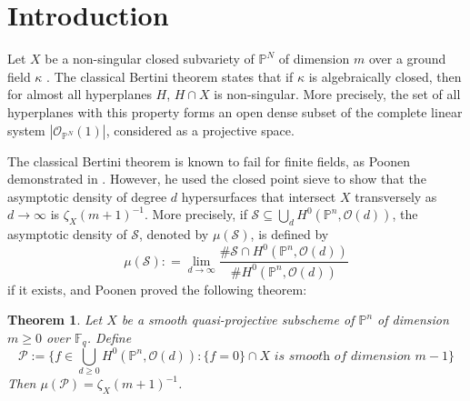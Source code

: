 \documentclass[12pt]{article}
\theoremstyle{plain}
\newtheorem{theorem}[equation]{Theorem}
\theoremstyle{definition}
\newcommand{\IF}{\mathbb{F}}
\newcommand{\IP}{\mathbb{P}}
\newcommand{\sO}{\mathcal{O}}
\newcommand{\sP}{\mathcal{P}}
\newcommand{\sS}{\mathcal{S}}
\newcommand\union{\bigcup}
\newcommand{\<}{\langle}
\renewcommand{\>}{\rangle}
\begin{document}
\newpage

\section{Introduction}
Let $X$ be a non-singular closed subvariety of $\IP^N$ of dimension $m$ over a ground field $\kappa$ . The classical Bertini theorem states that if $\kappa$ is algebraically closed, then for almost all hyperplanes $H$, $H \cap X$ is non-singular. More precisely, the set of all hyperplanes with this property forms an open dense subset of the complete linear system $|\sO_{\IP^N}(1)|$, considered as a projective space.  

The classical Bertini theorem is known to fail for finite fields, as Poonen demonstrated in \cite{Poonen}. However, he used the closed point sieve to show that the asymptotic density of degree $d$ hypersurfaces that intersect $X$ transversely as $d \to \infty$ is $\zeta_{X}(m + 1)^{-1}$. More precisely, if $\sS \subseteq \union_d H^0(\IP^n, \sO(d))$, the asymptotic density of $\sS$, denoted by $\mu(\sS)$, is defined by 
$$ \mu(\sS) : = \lim_{d \to \infty} \frac{\# \sS \cap H^0(\IP^n, \sO(d))}{\# H^0(\IP^n, \sO(d))}$$
if it exists, and Poonen proved the following theorem:
\begin{theorem}
Let $X$ be a smooth quasi-projective subscheme of $\IP^n$ of dimension $m \ge 0$ over $\IF_q$. Define 
$$ \sP := \{ f \in \union_{d \ge 0} H^0(\IP^n, \sO(d)) : \{ f = 0 \} \cap X \textit{ is smooth of dimension } m - 1 \}$$
Then $\mu(\sP) = \zeta_X(m + 1)^{-1}$. 
\end{theorem}
\end{document}
